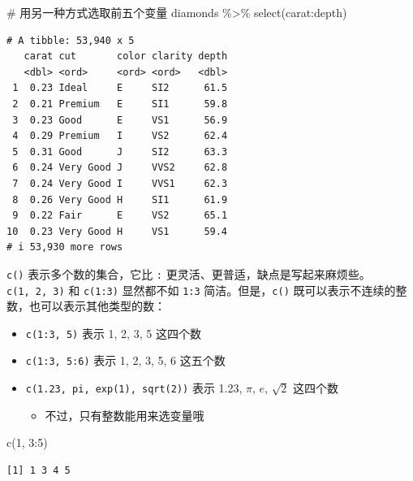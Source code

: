 \documentclass[
  letterpaper,
]{ctexbook}
\newenvironment{Shaded}{\begin{snugshade}}{\end{snugshade}}
\newcommand{\CommentTok}[1]{\textcolor[rgb]{0.37,0.37,0.37}{#1}}
\newcommand{\DecValTok}[1]{\textcolor[rgb]{0.68,0.00,0.00}{#1}}
\newcommand{\FunctionTok}[1]{\textcolor[rgb]{0.28,0.35,0.67}{#1}}
\newcommand{\NormalTok}[1]{\textcolor[rgb]{0.00,0.23,0.31}{#1}}
\newcommand{\SpecialCharTok}[1]{\textcolor[rgb]{0.37,0.37,0.37}{#1}}
\providecommand{\tightlist}{%
  \setlength{\itemsep}{0pt}\setlength{\parskip}{0pt}}\usepackage{longtable,booktabs,array}
\begin{document}
\begin{Shaded}
\begin{Highlighting}[]
\CommentTok{\# 用另一种方式选取前五个变量}
\NormalTok{diamonds }\SpecialCharTok{\%\textgreater{}\%}
  \FunctionTok{select}\NormalTok{(carat}\SpecialCharTok{:}\NormalTok{depth)}
\end{Highlighting}
\end{Shaded}

\begin{verbatim}
# A tibble: 53,940 x 5
   carat cut       color clarity depth
   <dbl> <ord>     <ord> <ord>   <dbl>
 1  0.23 Ideal     E     SI2      61.5
 2  0.21 Premium   E     SI1      59.8
 3  0.23 Good      E     VS1      56.9
 4  0.29 Premium   I     VS2      62.4
 5  0.31 Good      J     SI2      63.3
 6  0.24 Very Good J     VVS2     62.8
 7  0.24 Very Good I     VVS1     62.3
 8  0.26 Very Good H     SI1      61.9
 9  0.22 Fair      E     VS2      65.1
10  0.23 Very Good H     VS1      59.4
# i 53,930 more rows
\end{verbatim}

\texttt{c()} 表示多个数的集合，它比 \texttt{:}
更灵活、更普适，缺点是写起来麻烦些。\texttt{c(1,\ 2,\ 3)} 和
\texttt{c(1:3)} 显然都不如 \texttt{1:3} 简洁。但是，\texttt{c()}
既可以表示不连续的整数，也可以表示其他类型的数：

\begin{itemize}
\tightlist
\item
  \texttt{c(1:3,\ 5)} 表示 1, 2, 3, 5 这四个数
\item
  \texttt{c(1:3,\ 5:6)} 表示 1, 2, 3, 5, 6 这五个数
\item
  \texttt{c(1.23,\ pi,\ exp(1),\ sqrt(2))} 表示 1.23, \(\pi\), \(e\),
  \(\sqrt{2}\) 这四个数

  \begin{itemize}
  \tightlist
  \item
    不过，只有整数能用来选变量哦
  \end{itemize}
\end{itemize}

\begin{Shaded}
\begin{Highlighting}[]
\FunctionTok{c}\NormalTok{(}\DecValTok{1}\NormalTok{, }\DecValTok{3}\SpecialCharTok{:}\DecValTok{5}\NormalTok{)}
\end{Highlighting}
\end{Shaded}

\begin{verbatim}
[1] 1 3 4 5
\end{verbatim}
\end{document}
